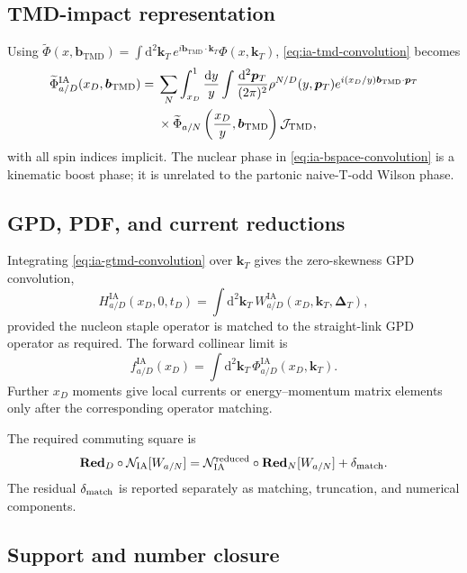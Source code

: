 \documentclass[11pt]{article}
\newcommand{\kT}{\bm{k}_{T}}
\newcommand{\pT}{\bm{p}_{T}}
\newcommand{\DT}{\bm{\Delta}_{T}}
\newcommand{\bM}{\bm{b}_{\mathrm{TMD}}}
\newcommand{\dd}{\mathrm{d}}
\newcommand{\TMD}{\mathrm{TMD}}
\newcommand{\Red}{\mathbf{Red}}
\newcommand{\cN}{\mathcal N}
\newcommand{\cJ}{\mathcal J}
\newcommand{\IA}{\mathrm{IA}}
\begin{document}
\subsection{TMD-impact representation}

Using
\(
 \widetilde\Phi(x,\bM)=\int\dd^2\kT\,e^{i\bM\cdot\kT}\Phi(x,\kT)
\),
\cref{eq:ia-tmd-convolution} becomes
\begin{align}
 \widetilde\Phi_{a/D}^{\IA}(x_D,\bM)
 ={}&\sum_N
 \int_{x_D}^{1}\frac{\dd y}{y}
 \int\frac{\dd^2\pT}{(2\pi)^2}
 \rho^{N/D}(y,\pT)
 e^{i(x_D/y)\bM\cdot\pT}
 \notag\\
 &\times
 \widetilde\Phi_{a/N}
 \left(\frac{x_D}{y},\bM\right)
 \cJ_{\TMD},
\label{eq:ia-bspace-convolution}
\end{align}
with all spin indices implicit.  The nuclear phase in
\cref{eq:ia-bspace-convolution} is a kinematic boost phase; it is unrelated
to the partonic naive-T-odd Wilson phase.

\subsection{GPD, PDF, and current reductions}

Integrating \cref{eq:ia-gtmd-convolution} over \(\kT\) gives the zero-skewness
GPD convolution,
\begin{equation}
 H_{a/D}^{\IA}(x_D,0,t_D)
 =\int\dd^2\kT\,W_{a/D}^{\IA}(x_D,\kT,\DT),
\label{eq:ia-gpd-reduction}
\end{equation}
provided the nucleon staple operator is matched to the straight-link GPD
operator as required.  The forward collinear limit is
\begin{equation}
 f_{a/D}^{\IA}(x_D)
 =\int\dd^2\kT\,\Phi_{a/D}^{\IA}(x_D,\kT).
\label{eq:ia-pdf-reduction}
\end{equation}
Further \(x_D\) moments give local currents or energy--momentum matrix
elements only after the corresponding operator matching.

The required commuting square is
\begin{equation}
 \Red_D\circ\cN_{\IA}[W_{a/N}]
 =\cN_{\IA}^{\rm reduced}\circ\Red_N[W_{a/N}]
 +\delta_{\rm match}.
\label{eq:ia-reduction-square}
\end{equation}
The residual \(\delta_{\rm match}\) is reported separately as matching,
truncation, and numerical components.

\subsection{Support and number closure}
\end{document}
